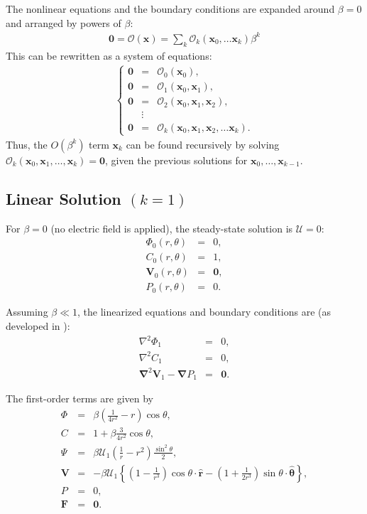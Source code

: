 \documentclass[final]{elsarticle}
\newcommand{\brc}[2]{\left\{\begin{array}{#1}#2\end{array}\right.}
\newcommand{\pars}[1]{\left(#1\right)}
\newcommand{\brcs}[1]{\left\{#1\right\}}
\newcommand\Laplacian{\nabla^2}
\newcommand\bnabla{\boldsymbol{\nabla}}
\newcommand\bLaplacian{\boldsymbol{\nabla}^2}
\newcommand\bV{\boldsymbol{V}}
\newcommand\bF{\boldsymbol{F}}
\newcommand\bx{\boldsymbol{x}}
\newcommand\br{\boldsymbol{r}}
\newcommand\brhat{\hat{\br}}
\newcommand\btheta{\boldsymbol{\theta}}
\newcommand\bthetahat{\hat{\btheta}}
\newcommand\bzero{\boldsymbol{0}}
\newcommand\cO{\mathcal{O}}
\newcommand\cU{\mathscr{U}}
\begin{document}
The nonlinear equations and the boundary conditions are expanded around $\beta = 0$
and arranged by powers of $\beta$:
\begin{eqnarray*}
\bzero = \cO(\bx) = \sum_k \cO_k(\bx_0, \ldots \bx_k) \beta^k
\end{eqnarray*}
This can be rewritten as a system of equations:
\begin{eqnarray*}
\brc{rcl}{
\bzero &=& \cO_0(\bx_0), \\
\bzero &=& \cO_1(\bx_0, \bx_1), \\
\bzero &=& \cO_2(\bx_0, \bx_1, \bx_2), \\
& \vdots & \\
\bzero &=& \cO_k(\bx_0, \bx_1, \bx_2, \ldots \bx_k).
}
\end{eqnarray*}
Thus, the $O(\beta^k)$ term $\bx_k$ can be found recursively by solving 
$\cO_k(\bx_0, \bx_1, \ldots, \bx_k) = \bzero$,
given the previous solutions for $\bx_0, \ldots, \bx_{k-1}$.

\subsection{Linear Solution $(k=1)$} \label{app:linear}

For $\beta = 0$ (no electric field is applied), the steady-state solution is $\cU = 0$:
\begin{eqnarray*}
\varPhi_0(r,\theta) &=& 0, \\
C_0(r,\theta) &=& 1, \\
\bV_0(r,\theta) &=& \bzero, \\
P_0(r,\theta) &=& 0.
\end{eqnarray*}

Assuming $\beta \ll 1$, the linearized equations and boundary conditions are 
(as developed in \cite{yariv2010migration}):
\begin{eqnarray*}
\Laplacian \varPhi_1 &=& 0, \\
\Laplacian C_1 &=& 0, \\
\bLaplacian \bV_1 - \bnabla P_1 &=& \bzero.
\end{eqnarray*}

The first-order terms are given by
\begin{eqnarray*}
\varPhi &=& \beta \pars{\frac{1}{4r^2} - r}\cos\theta, \\
C &=& 1 + \beta \frac{3}{4r^2} \cos\theta, \\
\Psi &=& \beta \cU_1 \pars{\frac{1}{r} - r^2} \frac{\sin^2\theta}{2}, \\
\bV &=& -\beta \cU_1 \brcs{\pars{1 - \frac{1}{r^3}}\cos\theta \cdot \brhat - 
                               \pars{1 + \frac{1}{2r^3}} \sin\theta \cdot \bthetahat}, \\
P &=& 0, \\
\bF &=& \bzero.
\end{eqnarray*}
\end{document}
